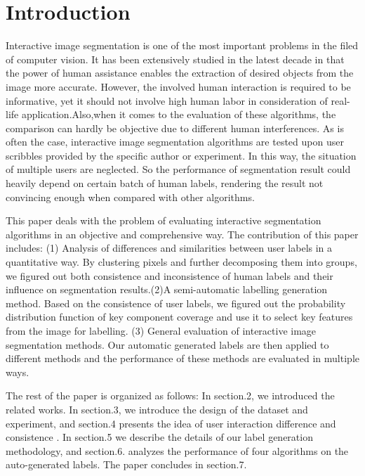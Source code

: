 \documentclass[runningheads,a4paper]{llncs}
\begin{document}
\section{Introduction}

Interactive image segmentation is one of the most important problems in the filed of computer vision. It has been extensively studied in the latest decade in that the power of human assistance enables the extraction of desired objects from the image more accurate. However, the involved human interaction is required to be informative, yet it should not involve high human labor in consideration of real-life application.Also,when it comes to the evaluation of these algorithms, the comparison can hardly be objective due to different human interferences. As is often the case, interactive image segmentation algorithms are tested upon user scribbles provided by the specific author or experiment. In this way, the situation of multiple users are neglected. So the performance of segmentation result could heavily depend on certain batch of human labels, rendering the result not convincing enough when compared with other algorithms.

This paper deals with the problem of evaluating interactive segmentation algorithms in an objective and comprehensive way. The contribution of this paper includes: (1)  Analysis of differences and similarities between user labels in a quantitative way. By clustering pixels and further decomposing them into groups, we figured out both consistence and inconsistence of human labels and their influence on segmentation results.(2)A semi-automatic labelling generation method. Based on the consistence of user labels, we figured out the probability distribution function of key component coverage and use it to select key features from the image for labelling. (3) General evaluation of interactive image segmentation methods. Our automatic generated labels are then applied to different methods and the performance of these methods are evaluated in multiple ways.

The rest of the paper is organized as follows: In section.2, we introduced the related works. In section.3, we introduce the design of the dataset and experiment, and section.4 presents the idea of user interaction difference and consistence . In section.5 we describe the details of our label generation methodology, and section.6. analyzes the performance of four algorithms on the auto-generated labels. The paper concludes in section.7.
\end{document}
